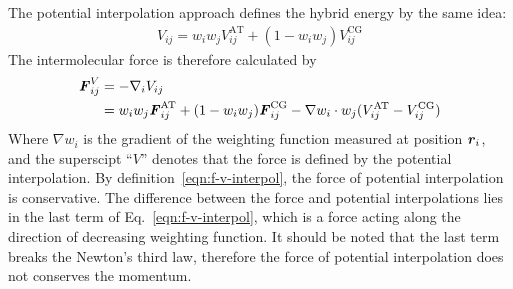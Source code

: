\documentclass[epjST]{svjour}
\newcommand{\vect}[1]{\textbf{\textit{#1}}}
\newcommand{\AT}[0]{\textrm{AT}}
\newcommand{\CG}[0]{\textrm{CG}}
\newcommand{\moleidxone}[0]{i}
\newcommand{\moleidxtwo}[0]{j}
\begin{document}
The potential interpolation approach defines the hybrid energy by the same idea:
\begin{align}\label{eqn:v-v-interpol}
  {V}_{\moleidxone \moleidxtwo}=w_\moleidxone w_\moleidxtwo{V}_{\moleidxone\moleidxtwo}^{\AT}+(1-w_\moleidxone w_\moleidxtwo){V}^{\CG}_{\moleidxone\moleidxtwo} 
\end{align}
The intermolecular force is therefore calculated by
\begin{align}\nonumber
  {\vect F}^V_{\moleidxone \moleidxtwo}&= -\nabla_{\moleidxone}{V}_{\moleidxone \moleidxtwo} \\ \label{eqn:f-v-interpol}
  &=w_\moleidxone w_\moleidxtwo{\vect F}_{\moleidxone\moleidxtwo}^{\AT}+(1-w_\moleidxone w_\moleidxtwo){\vect F}^{\CG}_{\moleidxone\moleidxtwo}  - \nabla w_\moleidxone\cdot w_\moleidxtwo (V^\AT_{\moleidxone \moleidxtwo} - V^\CG_{\moleidxone \moleidxtwo})
\end{align}
Where $\nabla w_\moleidxone$ is the gradient of the weighting function measured at position $\vect r_\moleidxone$,
and the superscipt ``$V$'' denotes that the force is defined
by the potential interpolation.
By  definition~\eqref{eqn:f-v-interpol}, the force of potential interpolation is conservative. 
The difference between the force and potential
interpolations lies in the last term  of Eq.~\eqref{eqn:f-v-interpol}, which is a force
acting along the direction of decreasing weighting function.
It should be noted that
the last term breaks the Newton's third law, therefore the force of potential interpolation
does not conserves the momentum.
\end{document}
